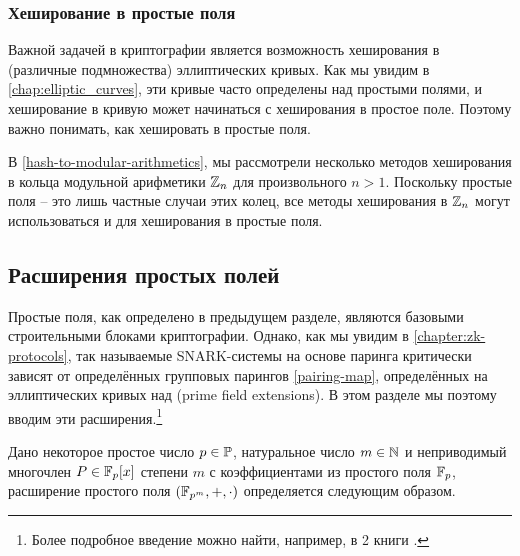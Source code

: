 \subsubsection{Хеширование в простые поля}\label{hashing-prime-fields}
Важной задачей в криптографии является возможность хеширования в (различные подмножества) эллиптических кривых. Как мы увидим в \chaptname{} \ref{chap:elliptic_curves}, эти кривые часто определены над простыми полями, и хеширование в кривую может начинаться с хеширования в простое поле. Поэтому важно понимать, как хешировать в простые поля.

В \secname{} \ref{hash-to-modular-arithmetics}, мы рассмотрели несколько методов хеширования в кольца модульной арифметики $\mathbb{Z}_n$ для произвольного $n>1$. Поскольку простые поля -- это лишь частные случаи этих колец, все методы хеширования в $\mathbb{Z}_n$ могут использоваться и для хеширования в простые поля.

\subsection{Расширения простых полей}\label{field-extension}
Простые поля, как определено в предыдущем разделе, являются базовыми строительными блоками криптографии. Однако, как мы увидим в \chaptname{} \ref{chapter:zk-protocols}, так называемые SNARK-системы на основе паринга критически зависят от определённых групповых парингов \eqref{pairing-map}, определённых на эллиптических кривых над  (prime field extensions). В этом разделе мы поэтому вводим эти расширения.\footnote{Более подробное введение можно найти, например, в \chaptname{} 2 книги \cite{nieder-1986}.}

Дано некоторое простое число $p\in \mathbb{P}$, натуральное число $m\in\mathbb{N}$ и неприводимый многочлен $P\in \mathbb{F}_p[x]$ степени $m$ с коэффициентами из простого поля $\mathbb{F}_p$, расширение простого поля $(\mathbb{F}_{p^m},+,\cdot)$ определяется следующим образом.

